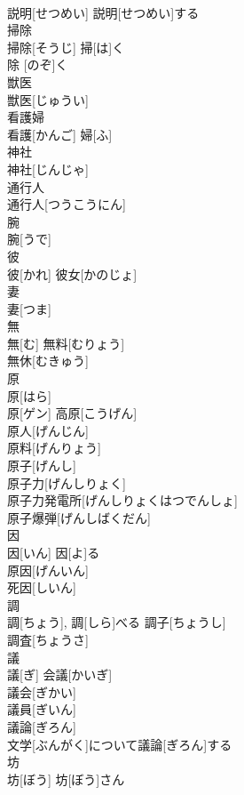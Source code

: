 \documentclass[8pt]{extreport}
\begin{document}
\begin{CJK}{UTF8}{min}
\\	説明[せつめい]	説明[せつめい]する 
\\	掃除	
\\	掃除[そうじ]	掃[は]く 
\\	除 [のぞ]く 
\\	獣医	
\\	獣医[じゅうい]	
\\	看護婦	
\\	看護[かんご] 婦[ふ]	
\\	神社	
\\	神社[じんじゃ]	
\\	通行人	
\\	通行人[つうこうにん]	
\\	腕	
\\	腕[うで]	
\\	彼	
\\	彼[かれ]	彼女[かのじょ]　
\\	妻	
\\	妻[つま]	
\\	無	
\\	無[む]	無料[むりょう] 
\\	無休[むきゅう] 
\\	原	
\\	原[はら] 
\\	原[ゲン]	高原[こうげん] 
\\	原人[げんじん] 
\\	原料[げんりょう] 
\\	原子[げんし] 
\\	原子力[げんしりょく] 
\\	原子力発電所[げんしりょくはつでんしょ] 
\\	原子爆弾[げんしばくだん] 
\\	因	
\\	因[いん]	因[よ]る 
\\	原因[げんいん] 
\\	死因[しいん] 
\\	調	
\\	調[ちょう], 調[しら]べる	調子[ちょうし] 
\\	調査[ちょうさ] 
\\	議	
\\	議[ぎ]	会議[かいぎ] 
\\	議会[ぎかい] 
\\	議員[ぎいん] 
\\	議論[ぎろん] 
\\	文学[ぶんがく]について議論[ぎろん]する 
\\	坊	
\\	坊[ぼう]	坊[ぼう]さん 

\end{CJK}
\end{document}
